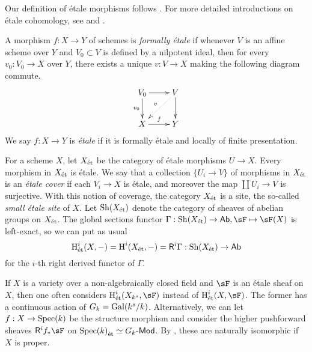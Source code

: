 \documentclass{article}
\begin{document}
Our definition of \'etale morphisms follows \cite[17.1]{ega4}. For more 
detailed introductions on \'etale cohomology, see \cite{mi-ec} and \cite{de77}. 





\begin{definition}
A morphism $f:X\to Y$ of schemes is \emph{formally \'etale} if whenever 
$V$ is an affine scheme over $Y$ and $V_0\subset V$ is defined by a nilpotent 
ideal, then for every $v_0:V_0 \to X$ over $Y$, there exists a unique 
$v:V\to X$ making the following diagram commute. 
\[\xymatrix{
  V_0 \ar[r] \ar[d]_-{v_0} 
    & V \ar[d] \ar@{.>}[dl]_-v \\
  X \ar[r]^-f 
    & Y
}\]
We say $f:X\to Y$ is \emph{\'etale} if it is formally \'etale and locally of 
finite presentation. 
\end{definition}

For a scheme $X$, let ${X}_\textnormal{\'et}$ be the category of \'etale morphisms 
$U\to X$. Every morphism in ${X}_\textnormal{\'et}$ is \'etale. We say that a collection 
$\{U_i\to V\}$ of morphisms in ${X}_\textnormal{\'et}$ is an \emph{\'etale cover} if each 
$V_i \to X$ is \'etale, and moreover the map $\coprod U_i \to V$ is surjective. 
With this notion of coverage, the category ${X}_\textnormal{\'et}$ is a site, the so-called 
\emph{small \'etale site} of $X$. Let $\operatorname{Sh}({X}_\textnormal{\'et})$ denote the category of 
sheaves of abelian groups on ${X}_\textnormal{\'et}$. The global sections functor 
$\Gamma:\sheaf(\et X) \to \mathsf{Ab},\sF\mapsto \sF(X)$ is left-exact, so we 
can put as usual 
\[
  \operatorname{H}_\text{\'et}^i(X,-) = \operatorname{H}^i({X}_\textnormal{\'et},-) = \mathsf R^i \Gamma :\operatorname{Sh}({X}_\textnormal{\'et}) \to \mathsf{Ab}
\]
for the $i$-th right derived functor of $\Gamma$. 

If $X$ is a variety over a non-algebraically closed field and $\sF$ is an 
\'etale sheaf on $X$, then one often considers 
$\h_\text{\'et}^i(X_{k^s},\sF)$ instead of $\h_\text{\'et}^i(X,\sF)$. The 
former has a continuous action of $G_k=\operatorname{Gal}(k^s/k)$. Alternatively, we can 
let $f:X\to \operatorname{Spec}(k)$ be the structure morphism and consider the higher 
pushforward sheaves $\mathsf R^i f_\ast \sF$ on 
${\operatorname{Spec}(k)}_\textnormal{\'et}\simeq G_k\text{-}\mathsf{Mod}$. By \cite[I 4.1.1]{de77}, these 
are naturally isomorphic if $X$ is proper. 
\end{document}
